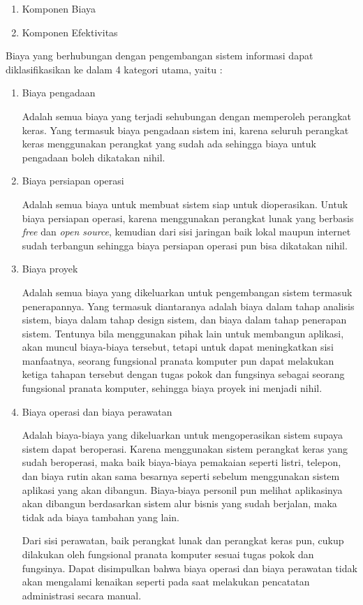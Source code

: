 \documentclass[pdftex,12pt, oneside]{article}
\begin{document}
\begin{enumerate}[1.]
  \item Komponen Biaya
  \item Komponen Efektivitas
\end{enumerate}

Biaya yang berhubungan dengan pengembangan sistem informasi dapat diklasifikasikan ke dalam 4 kategori utama, yaitu :

\begin{enumerate}[1.]
  \item Biaya pengadaan

Adalah semua biaya yang terjadi sehubungan dengan memperoleh perangkat keras. Yang termasuk biaya pengadaan sistem ini, karena seluruh perangkat keras menggunakan perangkat yang sudah ada sehingga biaya untuk pengadaan boleh dikatakan nihil.
  
  \item Biaya persiapan operasi
  
Adalah semua biaya untuk membuat sistem siap untuk dioperasikan. Untuk biaya persiapan operasi, karena menggunakan perangkat lunak yang berbasis \textit{free} dan \textit{open source}, kemudian dari sisi jaringan baik lokal maupun internet sudah terbangun sehingga biaya persiapan operasi pun bisa dikatakan nihil.

  \item Biaya proyek

Adalah semua biaya yang dikeluarkan untuk pengembangan sistem termasuk penerapannya. Yang termasuk diantaranya adalah biaya dalam tahap analisis sistem, biaya dalam tahap design sistem, dan biaya dalam tahap penerapan sistem. Tentunya bila menggunakan pihak lain untuk membangun aplikasi, akan muncul biaya-biaya tersebut, tetapi untuk dapat meningkatkan sisi manfaatnya, seorang fungsional pranata komputer pun dapat melakukan ketiga tahapan tersebut dengan tugas pokok dan fungsinya sebagai seorang fungsional pranata komputer, sehingga biaya proyek ini menjadi nihil.
  
  \item Biaya operasi dan biaya perawatan 
  
Adalah biaya-biaya yang dikeluarkan untuk mengoperasikan sistem supaya sistem dapat beroperasi. Karena menggunakan sistem perangkat keras yang sudah beroperasi, maka baik biaya-biaya pemakaian seperti listri, telepon, dan biaya rutin akan sama besarnya seperti sebelum menggunakan sistem aplikasi yang akan dibangun. Biaya-biaya personil pun melihat aplikasinya akan dibangun berdasarkan sistem alur bisnis yang sudah berjalan, maka tidak ada biaya tambahan yang lain. 

Dari sisi perawatan, baik perangkat lunak dan perangkat keras pun, cukup dilakukan oleh fungsional pranata komputer sesuai tugas pokok dan fungsinya. Dapat disimpulkan bahwa biaya operasi dan biaya perawatan tidak akan mengalami kenaikan seperti pada saat melakukan pencatatan administrasi secara manual.

\end{enumerate}
\end{document}
